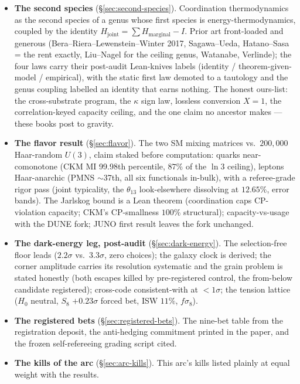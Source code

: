 \documentclass[11pt,a4paper]{article}
\begin{document}
\begin{itemize}[leftmargin=*,itemsep=0.5em]
\item \textbf{The second species} (\S\ref{sec:second-species}). Coordination thermodynamics as the second species of a genus whose first species is energy-thermodynamics, coupled by the identity $H_{\text{joint}} = \sum H_{\text{marginal}} - I$. Prior art front-loaded and generous (Bera--Riera--Lewenstein--Winter 2017, Sagawa--Ueda, Hatano--Sasa = the rent exactly, Liu--Nagel for the ceiling genus, Watanabe, Verlinde); the four laws carry their post-audit Lean-knives labels (identity / theorem-given-model / empirical), with the static first law demoted to a tautology and the genus coupling labelled an identity that earns nothing. The honest ours-list: the cross-substrate program, the $\kappa$ sign law, lossless conversion $X = 1$, the correlation-keyed capacity ceiling, and the one claim no ancestor makes --- these books post to gravity.
\item \textbf{The flavor result} (\S\ref{sec:flavor}). The two SM mixing matrices vs.\ $200{,}000$ Haar-random $U(3)$, claim staked before computation: quarks near-comonotone (CKM MI 99.98th percentile, $87\%$ of the $\ln 3$ ceiling), leptons Haar-anarchic (PMNS $\sim$37th, all six functionals in-bulk), with a referee-grade rigor pass (joint typicality, the $\theta_{13}$ look-elsewhere dissolving at $12.65\%$, error bands). The Jarlskog bound is a Lean theorem (coordination caps CP-violation capacity; CKM's CP-smallness $100\%$ structural); capacity-vs-usage with the DUNE fork; JUNO first result leaves the fork unchanged.
\item \textbf{The dark-energy leg, post-audit} (\S\ref{sec:dark-energy}). The selection-free floor leads ($2.2\sigma$ vs.\ $3.3\sigma$, zero choices); the galaxy clock is derived; the corner amplitude carries its resolution systematic and the grain problem is stated honestly (both escapes killed by pre-registered control, the from-below candidate registered); cross-code consistent-with at $<1\sigma$; the tension lattice ($H_0$ neutral, $S_8$ $+0.23\sigma$ forced bet, ISW $11\%$, $f\sigma_8$).
\item \textbf{The registered bets} (\S\ref{sec:registered-bets}). The nine-bet table from the registration deposit, the anti-hedging commitment printed in the paper, and the frozen self-refereeing grading script cited.
\item \textbf{The kills of the arc} (\S\ref{sec:arc-kills}). This arc's kills listed plainly at equal weight with the results.
\end{itemize}
\end{document}
